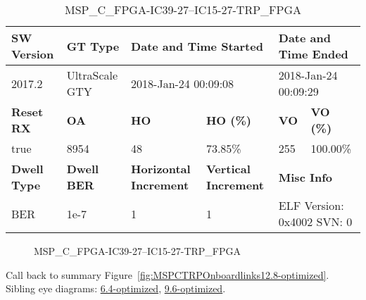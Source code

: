 \begin{table}[h]
\centering
\caption{MSP\_C\_FPGA-IC39-27--IC15-27-TRP\_FPGA}
\label{tab:MSPCFPGAIC3927IC1527TRPFPGA12.8-optimized}
\begin{tabular}{@{}|l|l|l|l|l|l|@{}}
\toprule
\textbf{SW Version}                & \textbf{GT Type}   & \multicolumn{2}{l|}{\textbf{Date and Time Started}}            & \multicolumn{2}{l|}{\textbf{Date and Time Ended}}        \\ \midrule
2017.2                       & UltraScale GTY          & \multicolumn{2}{l|}{2018-Jan-24 00:09:08}                   & \multicolumn{2}{l|}{2018-Jan-24 00:09:29}               \\ \midrule
\textbf{Reset RX}                  & \textbf{OA} & \textbf{HO}   & \textbf{HO (\%)} & \textbf{VO} & \textbf{VO (\%)} \\ \midrule
true & 8954        & 48          & 73.85\%        & 255        & 100.00\%       \\ \midrule
\textbf{Dwell Type}                & \textbf{Dwell BER} & \textbf{Horizontal Increment} & \textbf{Vertical Increment}    & \multicolumn{2}{l|}{\textbf{Misc Info}}                  \\ \midrule
BER                            & 1e-7        & 1        & 1           & \multicolumn{2}{l|}{ELF Version: 0x4002 SVN: 0}                         \\ \bottomrule
\end{tabular}
\end{table}

\begin{figure}[h]
\caption{MSP\_C\_FPGA-IC39-27--IC15-27-TRP\_FPGA} \label{fig:MSPCFPGAIC3927IC1527TRPFPGA12.8-optimized}
\end{figure}

Call back to summary Figure~\ref{fig:MSPCTRPOnboardlinks12.8-optimized}.
Sibling eye diagrams: \hyperref[sec:MSPCFPGAIC3927IC1527TRPFPGA6.4-optimized]{6.4-optimized}, \hyperref[sec:MSPCFPGAIC3927IC1527TRPFPGA9.6-optimized]{9.6-optimized}.

\clearpage
\newpage

